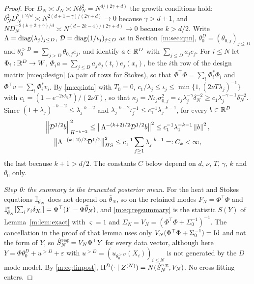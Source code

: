 \begin{proof}
For $D_N\asymp J_N\asymp N\delta_N^2=N^{d/(2\gamma+d)}$ the growth conditions hold: $\delta_N^2D_N^{2+2/d}\asymp N^{2(d+1-\gamma)/(2\gamma+d)}\to0$ because $\gamma>d+1$, and $ND_N^{-2(k+2+\gamma)/d}\asymp N^{(d-2k-4)/(2\gamma+d)}\to0$ because $k>d/2$. Write $\Lambda=\operatorname{diag}(\lambda_j)_{j\le D}$, $\mathcal D=\operatorname{diag}(1/\iota_j)_{j\le D}$ as in Section~\ref{m:sec:qnn}, $\theta_0^D=(\theta_{0,j})_{j\le D}$ and $\theta_0^{>D}=\sum_{j>D}\theta_{0,j}e_j$, and identify $a\in\mathbb{R}^D$ with $\sum_{j\le D}a_je_j$. For $i\le N$ let $\Phi_i:\mathbb{R}^D\to W$, $\Phi_ia=\sum_{j\le D}a_js_j(t_i)e_j(x_i)$, be the $i$th row of the design matrix \eqref{m:eq:design} (a pair of rows for Stokes), so that $\Phi^\top\Phi=\sum_i\Phi_i^*\Phi_i$ and $\Phi^\top v=\sum_i\Phi_i^*v_i$. By \eqref{m:eq:iota} with $T_0=0$, $c_1/\lambda_j\le\iota_j\le\min\{1,(2\nu T\lambda_j)^{-1}\}$ with $c_1=(1-e^{-2\nu\lambda_1T})/(2\nu T)$, so that $\kappa_j=N\iota_j\sigma^2_{0,j}=\iota_j\lambda_j^{-\gamma}\delta_N^{-2}\ge c_1\lambda_j^{-\gamma-1}\delta_N^{-2}$. Since $(1+\lambda_j)^{-k-2}\le\lambda_j^{-k-2}$ and $\lambda_j^{-k-2}\iota_j^{-1}\le c_1^{-1}\lambda_j^{-k-1}$, for every $b\in\mathbb{R}^D$
\[
\begin{gathered}
\left\|\mathcal D^{1/2}b\right\|^2_{H^{-k-2}}\le\big\|\Lambda^{-(k+2)/2}\mathcal D^{1/2}b\big\|^2\le c_1^{-1}\lambda_1^{-k-1}\left\|b\right\|^2,\\
\big\|\Lambda^{-(k+2)/2}\mathcal D^{1/2}\big\|^2_{HS}\le c_1^{-1}\sum_{j\ge1}\lambda_j^{-k-1}=:C_k<\infty,
\end{gathered}
\]
the last because $k+1>d/2$. The constants $C$ below depend on $d$, $\nu$, $T$, $\gamma$, $k$ and $\theta_0$ only.

\emph{Step 0: the summary is the truncated posterior mean.} For the heat and Stokes equations $\mathbb{I}_{\bar\theta_N}$ does not depend on $\bar\theta_N$, so on the retained modes $F_N=\Phi^\top\Phi$ and $\mathbb{I}^*_{\bar\theta_N}[\sum_ir_i\delta_{X_i}]=\Phi^\top(Y-\Phi\bar\theta_N)$, and \eqref{m:eq:regsummary} is the statistic $S(Y)$ of Lemma~\ref{m:lem:exact} with $\varsigma=1$ and $\Sigma_N=V_N=(\Phi^\top\Phi+\Sigma_0^{-1})^{-1}$. The cancellation in the proof of that lemma uses only $V_N(\Phi^\top\Phi+\Sigma_0^{-1})=\operatorname{Id}$ and not the form of $Y$, so $\hat S^{\rm reg}_N=V_N\Phi^\top Y$ for every data vector, although here $Y=\Phi\theta_0^D+u^{>D}+\varepsilon$ with $u^{>D}=(u_{\theta_0^{>D}}(X_i))_{i\le N}$ is not generated by the $D$ mode model. By \eqref{m:eq:linpost}, $\Pi^D(\cdot\mid Z^{(N)})=N(\hat S^{\rm reg}_N,V_N)$. No cross fitting enters.


\end{proof}

